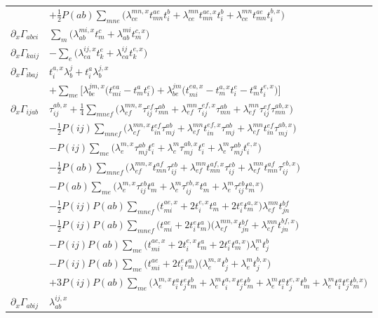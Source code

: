\documentclass[12pt]{article}
\begin{document}
{\begin{longtable}{ll}
 & $\displaystyle + \frac12 P(ab)\sum_{mne}\big(\lambda^{mn,x}_{ce}t^{ae}_{mn}t^b_i + \lambda^{mn}_{ce}t^{ae,x}_{mn}t^b_i + \lambda^{mn}_{ce}t^{ae}_{mn}t^{b,x}_i\big)$ \\
$\partial_x\Gamma_{abci}$ & $\displaystyle \sum_m\big(\lambda^{mi,x}_{ab}t^c_m + \lambda^{mi}_{ab}t^{c,x}_m\big)$ \\
$\partial_x\Gamma_{kaij}$ & $\displaystyle -\sum_e\big(\lambda^{ij,x}_{ea}t^e_k + \lambda^{ij}_{ea}t^{e,x}_k\big)$ \\
$\partial_x\Gamma_{ibaj}$ & $\displaystyle t^{a,x}_i\lambda^j_b + t^a_i\lambda^{j,x}_b$ \\
 & $\displaystyle + \sum_{me}\Big[\lambda^{jm,x}_{be}\big(t^{ea}_{mi} - t^a_m t^e_i\big) + \lambda^{jm}_{be}\big(t^{ea,x}_{mi} - t^{a,x}_m t^e_i - t^a_m t^{e,x}_i\big)\Big]$ \\
$\partial_x\Gamma_{ijab}$ & $\displaystyle \tau^{ab,x}_{ij} + \frac14\sum_{mnef}\big(\lambda^{mn,x}_{ef}\tau^{ef}_{ij}\tau^{ab}_{mn} + \lambda^{mn}_{ef}\tau^{ef,x}_{ij}\tau^{ab}_{mn} + \lambda^{mn}_{ef}\tau^{ef}_{ij}\tau^{ab,x}_{mn}\big)$ \\
 & $\displaystyle - \frac12 P(ij)\sum_{mnef}\big(\lambda^{mn,x}_{ef}t^{ef}_{in}\tau^{ab}_{mj} + \lambda^{mn}_{ef}t^{ef,x}_{in}\tau^{ab}_{mj} + \lambda^{mn}_{ef}t^{ef}_{in}\tau^{ab,x}_{mj}\big)$ \\
 & $\displaystyle - P(ij)\sum_{me}\big(\lambda^{m,x}_e\tau^{ab}_{mj}t^e_i + \lambda^m_e\tau^{ab,x}_{mj}t^e_i + \lambda^m_e\tau^{ab}_{mj}t^{e,x}_i\big)$ \\
 & $\displaystyle - \frac12 P(ab)\sum_{mnef}\big(\lambda^{mn,x}_{ef}t^{af}_{mn}\tau^{eb}_{ij} + \lambda^{mn}_{ef}t^{af,x}_{mn}\tau^{eb}_{ij} + \lambda^{mn}_{ef}t^{af}_{mn}\tau^{eb,x}_{ij}\big)$ \\
 & $\displaystyle - P(ab)\sum_{me}\big(\lambda^{m,x}_e\tau^{eb}_{ij}t^a_m + \lambda^m_e\tau^{eb,x}_{ij}t^a_m + \lambda^m_e\tau^{eb}_{ij}t^{a,x}_m\big)$ \\
 & $\displaystyle - \frac12 P(ij)P(ab)\sum_{mnef}\big(t^{ae,x}_{mi} + 2t^{e,x}_i t^a_m + 2t^e_i t^{a,x}_m\big)\lambda^{mn}_{ef}t^{bf}_{jn}$ \\
 & $\displaystyle - \frac12 P(ij)P(ab)\sum_{mnef}\big(t^{ae}_{mi} + 2t^e_i t^a_m\big)\big(\lambda^{mn,x}_{ef}t^{bf}_{jn} + \lambda^{mn}_{ef}t^{bf,x}_{jn}\big)$ \\
 & $\displaystyle - P(ij)P(ab)\sum_{me}\big(t^{ae,x}_{mi} + 2t^{e,x}_i t^a_m + 2t^e_i t^{a,x}_m\big)\lambda^m_e t^b_j$ \\
 & $\displaystyle - P(ij)P(ab)\sum_{me}\big(t^{ae}_{mi} + 2t^e_i t^a_m\big)\big(\lambda^{m,x}_e t^b_j + \lambda^m_e t^{b,x}_j\big)$ \\
 & $\displaystyle + 3P(ij)P(ab)\sum_{me}\big(\lambda^{m,x}_e t^a_i t^e_j t^b_m + \lambda^m_e t^{a,x}_i t^e_j t^b_m + \lambda^m_e t^a_i t^{e,x}_j t^b_m + \lambda^m_e t^a_i t^e_j t^{b,x}_m\big)$ \\
$\partial_x\Gamma_{abij}$ & $\displaystyle \lambda^{ij,x}_{ab}$ \\
\end{longtable}
}
\end{document}
